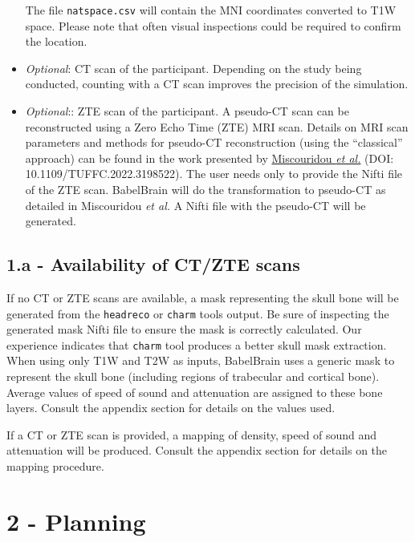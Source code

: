 \begin{itemize}
  The file \texttt{natspace.csv} will contain the MNI coordinates
  converted to T1W space. Please note that often visual inspections
  could be required to confirm the location.
\item
  \emph{Optional}: CT scan of the participant. Depending on the study
  being conducted, counting with a CT scan improves the precision of the
  simulation.
\item
  \emph{Optional}:: ZTE scan of the participant. A pseudo-CT scan can be
  reconstructed using a Zero Echo Time (ZTE) MRI scan. Details on MRI
  scan parameters and methods for pseudo-CT reconstruction (using the
  ``classical'' approach) can be found in the work presented by
  \href{https://ieeexplore.ieee.org/document/9856605}{Miscouridou
  \emph{et al.}} (DOI: 10.1109/TUFFC.2022.3198522). The user needs only
  to provide the Nifti file of the ZTE scan. BabelBrain will do the
  transformation to pseudo-CT as detailed in Miscouridou \emph{et al.} A
  Nifti file with the pseudo-CT will be generated.
\end{itemize}

\hypertarget{a---availability-of-ctzte-scans}{%
\subsection{1.a - Availability of CT/ZTE
scans}\label{a---availability-of-ctzte-scans}}

If no CT or ZTE scans are available, a mask representing the skull bone
will be generated from the \texttt{headreco} or \texttt{charm} tools
output. Be sure of inspecting the generated mask Nifti file to ensure
the mask is correctly calculated. Our experience indicates that
\texttt{charm} tool produces a better skull mask extraction. When using
only T1W and T2W as inputs, BabelBrain uses a generic mask to represent
the skull bone (including regions of trabecular and cortical bone).
Average values of speed of sound and attenuation are assigned to these
bone layers. Consult the appendix section for details on the values
used.

If a CT or ZTE scan is provided, a mapping of density, speed of sound
and attenuation will be produced. Consult the appendix section for
details on the mapping procedure.

\hypertarget{planning}{%
\section{2 - Planning}\label{planning}}

